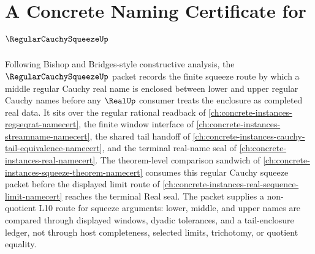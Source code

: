 \chapter{A Concrete Naming Certificate for $\RegularCauchySqueezeUp$}
\label{ch:concrete-instances-regular-cauchy-squeeze-namecert}

Following Bishop and Bridges-style constructive analysis, the $\RegularCauchySqueezeUp$ packet records the finite squeeze route by which a middle regular Cauchy real name is enclosed between lower and upper regular Cauchy names before any $\RealUp$ consumer treats the enclosure as completed real data. It sits over the regular rational readback of \autoref{ch:concrete-instances-regseqrat-namecert}, the finite window interface of \autoref{ch:concrete-instances-streamname-namecert}, the shared tail handoff of \autoref{ch:concrete-instances-cauchy-tail-equivalence-namecert}, and the terminal real-name seal of \autoref{ch:concrete-instances-real-namecert}. The theorem-level comparison sandwich of \autoref{ch:concrete-instances-squeeze-theorem-namecert} consumes this regular Cauchy squeeze packet before the displayed limit route of \autoref{ch:concrete-instances-real-sequence-limit-namecert} reaches the terminal Real seal. The packet supplies a non-quotient L10 route for squeeze arguments: lower, middle, and upper names are compared through displayed windows, dyadic tolerances, and a tail-enclosure ledger, not through host completeness, selected limits, trichotomy, or quotient equality.

